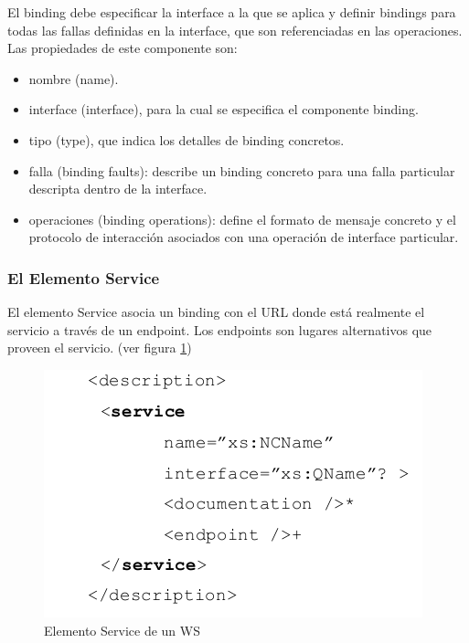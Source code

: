 El binding debe especificar la interface a la que se aplica y definir bindings para todas las fallas definidas en la interface, que son referenciadas en las operaciones.
Las propiedades de este componente son:\\
\begin{itemize}
	\item nombre (name).
	\item interface (interface), para la cual se especifica el componente binding.
	\item tipo (type), que indica los detalles de binding concretos.
	\item falla (binding faults): describe un binding concreto para una falla particular descripta dentro de la interface.
	\item operaciones (binding operations): define el formato de mensaje concreto y el protocolo de interacción asociados con una operación de interface particular.
\end{itemize}

\subsubsection*{El Elemento Service}

El elemento Service asocia un binding con el URL donde está realmente el servicio a través de un endpoint. Los endpoints son lugares alternativos que proveen el servicio. (ver figura \ref{fig:Elemento Service de un WS})

\begin{figure}[!h] 
	\begin{center}
		\includegraphics [scale=0.70]{imagenes/elemento_service.png}
	\end{center}
	\caption{Elemento Service de un WS}
	\label{fig:Elemento Service de un WS}
\end{figure} 

